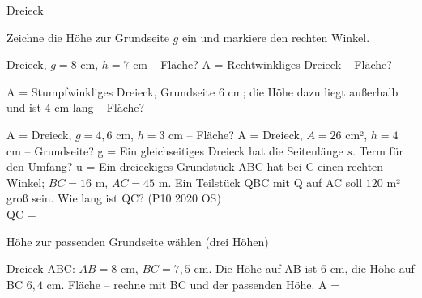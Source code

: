 \setcounter{aufgabe}{17}

\begin{aufgabe}{Dreieck}
\begin{teile}
\teil Zeichne die Höhe zur Grundseite $g$ ein und markiere den rechten Winkel.

\teil Dreieck, $g = 8$ cm, $h = 7$ cm – Fläche? A = \leerfeld[cm²]
\teil Rechtwinkliges Dreieck – Fläche?

A = \leerfeld[cm²]
\teil Stumpfwinkliges Dreieck, Grundseite $6$ cm; die Höhe dazu liegt außerhalb und ist $4$ cm lang – Fläche?

A = \leerfeld[cm²]
\teil Dreieck, $g = 4{,}6$ cm, $h = 3$ cm – Fläche? A = \leerfeld[cm²]
\teil Dreieck, $A = 26$ cm², $h = 4$ cm – Grundseite? g = \leerfeld[cm]
\teil Ein gleichseitiges Dreieck hat die Seitenlänge $s$. Term für den Umfang? u = \leerfeld
\teil Ein dreieckiges Grundstück ABC hat bei C einen rechten Winkel; $BC = 16$ m, $AC = 45$ m. Ein Teilstück QBC mit Q auf AC soll $120$ m² groß sein. Wie lang ist QC? \hfill (P10 2020 OS) \\ QC = \leerfeld[m]
\end{teile}
\end{aufgabe}

\begin{aufgabe}{Höhe zur passenden Grundseite wählen (drei Höhen)}
\begin{teile}
\teil Dreieck ABC: $AB = 8$ cm, $BC = 7{,}5$ cm. Die Höhe auf AB ist $6$ cm, die Höhe auf BC $6{,}4$ cm. Fläche – rechne mit BC und der passenden Höhe. A = \leerfeld[cm²]
\end{teile}
\end{aufgabe}

